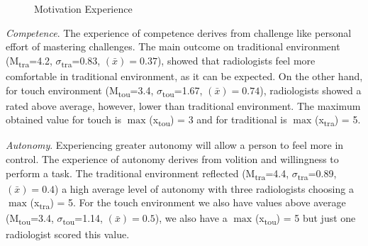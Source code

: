 \documentclass{sigchi}
\begin{document}
\begin{figure}
\caption{Motivation Experience}
\label{fig:Fig10}
\end{figure}

\textit{Competence}. The experience of competence derives from challenge like personal effort of mastering challenges. The main outcome on traditional environment (M\textsubscript{tra}=4.2, $\sigma$\textsubscript{tra}=0.83, {}$\left({\bar x}\right)=0.37$), showed that radiologists feel more comfortable in traditional environment, as it can be expected. On the other hand, for touch environment (M\textsubscript{tou}=3.4, $\sigma$\textsubscript{tou}=1.67, {}$\left({\bar x}\right)=0.74$), radiologists showed a rated above average, however, lower than traditional environment. The maximum obtained value for touch is $\max_{}$(x\textsubscript{tou}) = 3 and for traditional is $\max_{}$(x\textsubscript{tra}) = 5.

\textit{Autonomy}. Experiencing greater autonomy will allow a person to feel more in control. The experience of autonomy derives from volition and willingness to perform a task. The traditional environment reflected (M\textsubscript{tra}=4.4, $\sigma$\textsubscript{tra}=0.89, {}$\left({\bar x}\right)=0.4$) a high average level of autonomy with three radiologists choosing a $\max_{}$(x\textsubscript{tra}) = 5. For the touch environment we also have values above average (M\textsubscript{tou}=3.4, $\sigma$\textsubscript{tou}=1.14, {}$\left({\bar x}\right)=0.5$), we also have a $\max_{}$(x\textsubscript{tou}) = 5 but just one radiologist scored this value.
\end{document}
